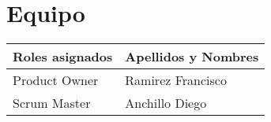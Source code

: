 \chapter{Equipo}

\begin{table}[htbp]
	\begin{center}
		\begin{tabular}{| p{4.2cm}| p{4.2cm} |}
			\hline
			Roles asignados & Apellidos y Nombres\\
			\hline \hline
			Product Owner & Ramirez Francisco \\ \hline
			Scrum Master & Anchillo Diego \\ \hline
		\end{tabular}
	\end{center}
\end{table}